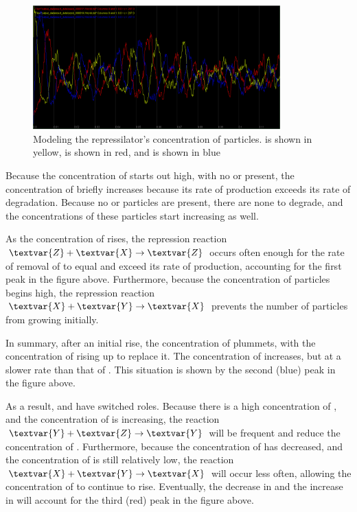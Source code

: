 \begin{figure}[h]
\centering
\mySfFamily
\includegraphics[width = 0.85\textwidth]{../images/repressilator_chart.png}
\caption{Modeling the repressilator's concentration of particles.  is shown in yellow,  is shown in red, and  is shown in blue}
\label{fig:repressilator_chart}
\end{figure}

Because the concentration of  starts out high, with no  or  present, the concentration of  briefly increases because its rate of production exceeds its rate of degradation. Because no  or  particles are present, there are none to degrade, and the concentrations of these particles start increasing as well.

As the concentration of  rises, the repression reaction $\textvar{Z} + \textvar{X} \rightarrow \textvar{Z}$ occurs often enough for the rate of removal of  to equal and exceed its rate of production, accounting for the first peak in the figure above. Furthermore, because the concentration of  particles begins high, the repression reaction $\textvar{X} + \textvar{Y} \rightarrow \textvar{X}$ prevents the number of  particles from growing initially.

In summary, after an initial rise, the concentration of  plummets, with the concentration of  rising up to replace it. The concentration of  increases, but at a slower rate than that of . This situation is shown by the second (blue) peak in the figure above.

As a result,  and  have switched roles. Because there is a high concentration of , and the concentration of  is increasing, the reaction $\textvar{Y} + \textvar{Z} \rightarrow \textvar{Y}$ will be frequent and reduce the concentration of . Furthermore, because the concentration of  has decreased, and the concentration of  is still relatively low, the reaction $\textvar{X} + \textvar{Y} \rightarrow \textvar{X}$ will occur less often, allowing the concentration of  to continue to rise. Eventually, the decrease in  and the increase in  will account for the third (red) peak in the figure above.

